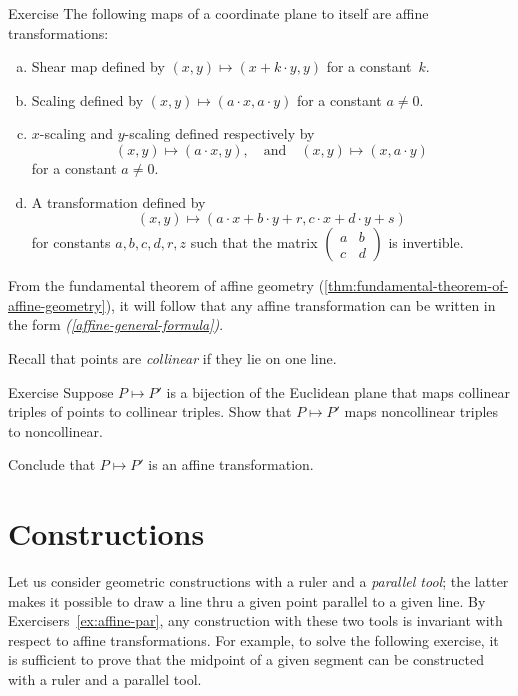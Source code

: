 \begin{thm}{Exercise}\label{ex:afine-linear}
The following maps of a coordinate plane to itself are affine transformations:
\begin{enumerate}[(a)]
\item\label{ex:afine-linear:shear} Shear map defined by $(x,y)\mapsto (x+k\cdot y,y)$ for a constant~$k$.
\item\label{ex:afine-linear:scaling} Scaling defined by $(x,y)\mapsto (a\cdot x,a\cdot y)$ for a constant $a\ne 0$.
\item $x$-scaling and $y$-scaling defined respectively by 
\[(x,y)\mapsto (a\cdot x,y),\quad\text{and}\quad(x,y)\mapsto (x,a\cdot y)\]
for a constant $a\ne 0$.
\item\label{affine-general-formula} A transformation defined by
\[(x,y)\mapsto(a\cdot x+b\cdot y+r,c\cdot x+d\cdot y+s)\]
for constants $a,b,c,d,r,z$ such that the matrix $(\begin{smallmatrix}a&b\\c&d\end{smallmatrix})$ is invertible. 
\end{enumerate}
\end{thm}

From the fundamental theorem of affine geometry (\ref{thm:fundamental-theorem-of-affine-geometry}), it will follow that any affine transformation can be written in the form \textit{(\ref{affine-general-formula})}.

Recall that points are \emph{collinear} if they lie on one line.

\begin{thm}{Exercise}\label{ex:collinear=affine}
Suppose $P\mapsto P'$ is a bijection of the Euclidean plane that maps collinear triples of points to collinear triples.
Show that $P\mapsto P'$ maps noncollinear triples to noncollinear.

Conclude that $P\mapsto P'$ is an affine transformation.
\end{thm}


\section*{Constructions}

Let us consider geometric constructions with a ruler and a \emph{parallel tool};
the latter makes it possible to draw a line thru a given point parallel to a given line.
By Exercisers~\ref{ex:affine-par}, any construction with these two tools is invariant with respect to affine transformations.
For example, 
to solve the following exercise,
it is sufficient to prove that the midpoint of a given segment can be constructed with a ruler and a parallel tool.

